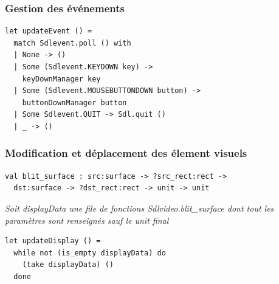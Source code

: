 \begin{frame}[fragile]
	\frametitle{Gestion des événements}
	\begin{lstlisting}
let updateEvent () = 
  match Sdlevent.poll () with
  | None -> ()
  | Some (Sdlevent.KEYDOWN key) -> 
    keyDownManager key
  | Some (Sdlevent.MOUSEBUTTONDOWN button) -> 
    buttonDownManager button
  | Some Sdlevent.QUIT -> Sdl.quit ()
  | _ -> ()
	\end{lstlisting}
\end{frame}

\begin{frame}[fragile]
	\frametitle{Modification et déplacement des élement visuels}
	\lstset{basicstyle=\scriptsize}
	\begin{lstlisting}
val blit_surface : src:surface -> ?src_rect:rect -> 
  dst:surface -> ?dst_rect:rect -> unit -> unit
	\end{lstlisting}
	\textit{Soit displayData une file de fonctions Sdlvideo.blit\_surface dont tout les paramètres sont renseignés sauf le unit final}
	\lstset{basicstyle=\normalsize}
	\begin{lstlisting}
let updateDisplay () = 
  while not (is_empty displayData) do
    (take displayData) ()
  done
	\end{lstlisting}
\end{frame}
